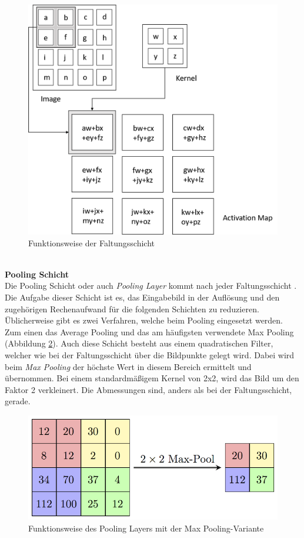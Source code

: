 \begin{figure}
	[h]
	\centering
	\includegraphics[scale=0.4]{Sources/CNN.png}
	\caption{Funktionsweise der Faltungsschicht \cite{convolutional2019layer}}
	\label{img:faltungsschicht}
\end{figure}\\
\textbf{Pooling Schicht}\\
Die Pooling Schicht oder auch \textit{Pooling Layer} kommt nach jeder Faltungsschicht \cite[336f.]{goodfellow2016deep}. Die Aufgabe dieser Schicht ist es, das Eingabebild in der Auflösung und den zugehörigen Rechenaufwand für die folgenden Schichten zu reduzieren. Üblicherweise gibt es zwei Verfahren, welche beim Pooling eingesetzt werden. Zum einen das Average Pooling und das am häufigsten verwendete Max Pooling (Abbildung \ref{img:maxpooling}). Auch diese Schicht besteht aus einem quadratischen Filter, welcher wie bei der Faltungsschicht über die Bildpunkte gelegt wird. Dabei wird beim \textit{Max Pooling} der höchste Wert in diesem Bereich ermittelt und übernommen. Bei einem standardmäßigem Kernel von 2x2, wird das Bild um den Faktor 2 verkleinert. Die Abmessungen sind, anders als bei der Faltungsschicht, gerade.
\begin{figure}
	[h]
	\centering
	\includegraphics[scale=1.8]{Sources/MaxpoolSample2.png}
	\caption{Funktionsweise des Pooling Layers mit der Max Pooling-Variante \cite{pooling2018layer}}
	\label{img:maxpooling}
\end{figure}\\

